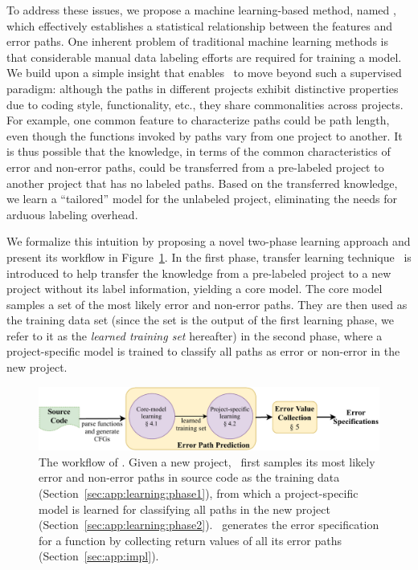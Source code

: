 \documentclass[12pt]{report}	%
\begin{document}
To address these issues, we propose a machine learning-based method, named \newTool,
which effectively establishes a statistical relationship between the features and error paths. 
One inherent problem of traditional machine learning methods is that 
considerable manual data labeling efforts are required for training a model.
We build upon a simple insight that enables \newTool\ to move 
beyond such a supervised paradigm:
although the paths in different projects exhibit distinctive properties 
due to coding style, functionality, etc.,
they share commonalities across projects. 
For example,
one common feature to characterize paths could be path length,
even though the functions invoked by paths vary from one project to another.
%
It is thus possible that the knowledge,
in terms of the common characteristics of error and non-error paths,
could be transferred from a pre-labeled project
to another project that has no labeled paths.
%
Based on the transferred knowledge, we learn
a ``tailored'' model for the unlabeled project,
eliminating the needs for arduous labeling overhead.

We formalize this intuition by proposing a novel two-phase learning approach 
and present its workflow in Figure~\ref{fig:workflow}.
%
In the first phase, 
transfer learning technique~\cite{pan2010survey} is introduced
to help transfer the knowledge from a pre-labeled project
to a new project without its label information, 
yielding a core model.
The core model 
samples a set of the most likely error and non-error paths.
%
They are then used
as the training data set (since the set
is the output of the first learning phase,
we refer to it as the \emph{learned training set} 
hereafter) in the second phase,
where a project-specific model is trained
to classify all paths as error or non-error in the new project.

\begin{figure}[t]
\centering
\includegraphics[width=0.95\linewidth]{images/errspec_arch.pdf}
\caption{The workflow of \newTool.
Given a new project, 
\newTool\ first samples its most likely error and non-error paths in source code as the training data (Section~\ref{sec:app:learning:phase1}), 
from which a project-specific model is learned for classifying all paths in the new project (Section~\ref{sec:app:learning:phase2}). 
\newTool\ generates the error specification for a function by collecting return values of all its error paths (Section~\ref{sec:app:impl}). 
}
\label{fig:workflow}
\end{figure}
\end{document}
